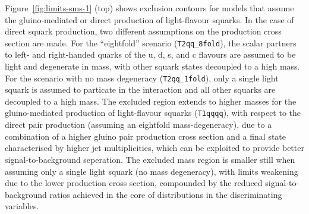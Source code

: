 Figure~\ref{fig:limits-sms-1} (top) shows exclusion contours for
models that assume the gluino-mediated or direct production of
light-flavour squarks. In the case of direct squark production, two
different assumptions on the production cross section are made. For
the ``eightfold'' scenario (\texttt{T2qq\_8fold}), the scalar partners
to left- and right-handed quarks of the u, d, s, and c flavours are
assumed to be light and degenerate in mass, with other squark states
decoupled to a high mass. For the scenario with no mass degeneracy
(\texttt{T2qq\_1fold}), only a single light squark is assumed to
particate in the interaction and all other squarks are decoupled to a
high mass. The excluded region extends to higher masses for the
gluino-mediated production of light-flavour squarks (\texttt{T1qqqq}),
with respect to the direct pair production (assuming an eightfold
mass-degeneracy), due to a combination of a higher gluino pair
production cross section and a final state characterised by higher jet
multiplicities, which can be exploited to provide better
signal-to-background seperation. The excluded mass region is smaller
still when assuming only a single light squark (\ie no mass
degeneracy), with limits weakening due to the lower production cross
section, compounded by the reduced signal-to-background ratios
achieved in the core of distributions in the discriminating variables.

